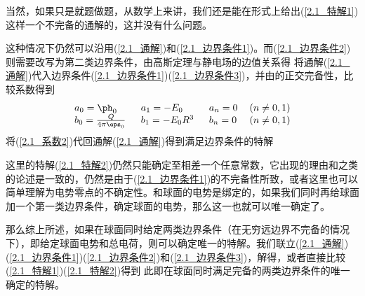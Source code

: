         当然，如果只是就题做题，从数学上来讲，我们还是能在形式上给出(\ref{2.1_特解1})这样一个不完备的通解的，这并没有什么问题。
    
    
        这种情况下仍然可以沿用(\ref{2.1_通解})和(\ref{2.1_边界条件1})。而(\ref{2.1_边界条件2})则需要改写为第二类边界条件，由高斯定理与静电场的边值关系得
        将通解(\ref{2.1_通解})代入边界条件(\ref{2.1_边界条件1})(\ref{2.1_边界条件3})，并由的正交完备性，比较系数得到
        \begin{equation}
            \begin{tabular}{llll}
                $a_0 = \ph_0$ \qquad 
                &$a_1 = -E_0$ \qquad 
                &$a_n = 0$ %
                &$(n\ne0,1)$ \\
                $b_{0} = \frac{Q}{4\pi\eps_0} $ \qquad 
                &$b_1 = -E_0R^3$ \qquad 
                &$b_n = 0 $%
                &$(n\ne0,1)$
            \end{tabular}
            \label{2.1_系数2}
        \end{equation}
        将(\ref{2.1_系数2})代回通解(\ref{2.1_通解})得到满足边界条件的特解
        
        这里的特解(\ref{2.1_特解2})仍然只能确定至相差一个任意常数，它出现的理由和之类的论述是一致的，仍然是由于(\ref{2.1_边界条件1})的不完备性所致，或者这里也可以简单理解为电势零点的不确定性。和球面的电势是绑定的，如果我们同时再给球面加一个第一类边界条件，确定球面的电势，那么这一也就可以唯一确定了。
        
        
        那么综上所述，如果在球面同时给定两类边界条件（在无穷远边界不完备的情况下），即给定球面电势\nota{\P}和总电荷，则可以确定唯一的特解。我们联立(\ref{2.1_通解})(\ref{2.1_边界条件1})(\ref{2.1_边界条件2})和(\ref{2.1_边界条件3})，解得，或者直接比较(\ref{2.1_特解1})(\ref{2.1_特解2})得到
        此即在球面同时满足完备的两类边界条件的唯一确定的特解。

